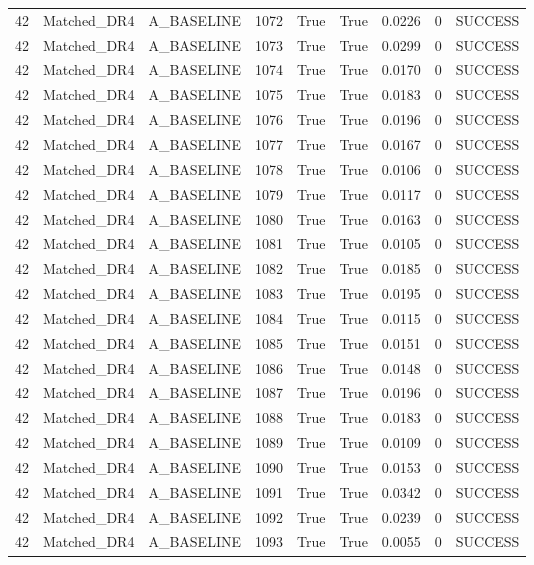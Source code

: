 \documentclass[11pt,a4paper,oneside]{book}
\begin{document}
\begin{longtable}{l l l l l l l l l}
42 & Matched\_DR4 & A\_BASELINE & 1072 & True & True & 0.0226 & 0 & SUCCESS \\
42 & Matched\_DR4 & A\_BASELINE & 1073 & True & True & 0.0299 & 0 & SUCCESS \\
42 & Matched\_DR4 & A\_BASELINE & 1074 & True & True & 0.0170 & 0 & SUCCESS \\
42 & Matched\_DR4 & A\_BASELINE & 1075 & True & True & 0.0183 & 0 & SUCCESS \\
42 & Matched\_DR4 & A\_BASELINE & 1076 & True & True & 0.0196 & 0 & SUCCESS \\
42 & Matched\_DR4 & A\_BASELINE & 1077 & True & True & 0.0167 & 0 & SUCCESS \\
42 & Matched\_DR4 & A\_BASELINE & 1078 & True & True & 0.0106 & 0 & SUCCESS \\
42 & Matched\_DR4 & A\_BASELINE & 1079 & True & True & 0.0117 & 0 & SUCCESS \\
42 & Matched\_DR4 & A\_BASELINE & 1080 & True & True & 0.0163 & 0 & SUCCESS \\
42 & Matched\_DR4 & A\_BASELINE & 1081 & True & True & 0.0105 & 0 & SUCCESS \\
42 & Matched\_DR4 & A\_BASELINE & 1082 & True & True & 0.0185 & 0 & SUCCESS \\
42 & Matched\_DR4 & A\_BASELINE & 1083 & True & True & 0.0195 & 0 & SUCCESS \\
42 & Matched\_DR4 & A\_BASELINE & 1084 & True & True & 0.0115 & 0 & SUCCESS \\
42 & Matched\_DR4 & A\_BASELINE & 1085 & True & True & 0.0151 & 0 & SUCCESS \\
42 & Matched\_DR4 & A\_BASELINE & 1086 & True & True & 0.0148 & 0 & SUCCESS \\
42 & Matched\_DR4 & A\_BASELINE & 1087 & True & True & 0.0196 & 0 & SUCCESS \\
42 & Matched\_DR4 & A\_BASELINE & 1088 & True & True & 0.0183 & 0 & SUCCESS \\
42 & Matched\_DR4 & A\_BASELINE & 1089 & True & True & 0.0109 & 0 & SUCCESS \\
42 & Matched\_DR4 & A\_BASELINE & 1090 & True & True & 0.0153 & 0 & SUCCESS \\
42 & Matched\_DR4 & A\_BASELINE & 1091 & True & True & 0.0342 & 0 & SUCCESS \\
42 & Matched\_DR4 & A\_BASELINE & 1092 & True & True & 0.0239 & 0 & SUCCESS \\
42 & Matched\_DR4 & A\_BASELINE & 1093 & True & True & 0.0055 & 0 & SUCCESS \\

\end{longtable}
\end{document}
